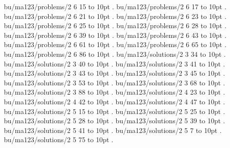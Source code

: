\smallskip
bu/ma123/problems/2 6 15 \leaders\hbox to 10pt {\hss.\hss}  \hfill {}
\smallskip
bu/ma123/problems/2 6 17 \leaders\hbox to 10pt {\hss.\hss}  \hfill {}
\smallskip
bu/ma123/problems/2 6 21 \leaders\hbox to 10pt {\hss.\hss}  \hfill {}
\smallskip
bu/ma123/problems/2 6 23 \leaders\hbox to 10pt {\hss.\hss}  \hfill {}
\smallskip
bu/ma123/problems/2 6 25 \leaders\hbox to 10pt {\hss.\hss}  \hfill {}
\smallskip
bu/ma123/problems/2 6 28 \leaders\hbox to 10pt {\hss.\hss}  \hfill {}
\smallskip
bu/ma123/problems/2 6 39 \leaders\hbox to 10pt {\hss.\hss}  \hfill {}
\smallskip
bu/ma123/problems/2 6 43 \leaders\hbox to 10pt {\hss.\hss}  \hfill {}
\smallskip
bu/ma123/problems/2 6 61 \leaders\hbox to 10pt {\hss.\hss}  \hfill {}
\smallskip
bu/ma123/problems/2 6 65 \leaders\hbox to 10pt {\hss.\hss}  \hfill {}
\smallskip
bu/ma123/problems/2 6 86 \leaders\hbox to 10pt {\hss.\hss}  \hfill {}
\smallskip
bu/ma123/solutions/2 3 34 \leaders\hbox to 10pt {\hss.\hss}  \hfill {}
\smallskip
bu/ma123/solutions/2 3 40 \leaders\hbox to 10pt {\hss.\hss}  \hfill {}
\smallskip
bu/ma123/solutions/2 3 41 \leaders\hbox to 10pt {\hss.\hss}  \hfill {}
\smallskip
bu/ma123/solutions/2 3 43 \leaders\hbox to 10pt {\hss.\hss}  \hfill {}
\smallskip
bu/ma123/solutions/2 3 45 \leaders\hbox to 10pt {\hss.\hss}  \hfill {}
\smallskip
bu/ma123/solutions/2 3 53 \leaders\hbox to 10pt {\hss.\hss}  \hfill {}
\smallskip
bu/ma123/solutions/2 3 68 \leaders\hbox to 10pt {\hss.\hss}  \hfill {}
\smallskip
bu/ma123/solutions/2 3 88 \leaders\hbox to 10pt {\hss.\hss}  \hfill {}
\smallskip
bu/ma123/solutions/2 4 23 \leaders\hbox to 10pt {\hss.\hss}  \hfill {}
\smallskip
bu/ma123/solutions/2 4 42 \leaders\hbox to 10pt {\hss.\hss}  \hfill {}
\smallskip
bu/ma123/solutions/2 4 47 \leaders\hbox to 10pt {\hss.\hss}  \hfill {}
\smallskip
bu/ma123/solutions/2 5 15 \leaders\hbox to 10pt {\hss.\hss}  \hfill {}
\smallskip
bu/ma123/solutions/2 5 25 \leaders\hbox to 10pt {\hss.\hss}  \hfill {}
\smallskip
bu/ma123/solutions/2 5 28 \leaders\hbox to 10pt {\hss.\hss}  \hfill {}
\smallskip
bu/ma123/solutions/2 5 39 \leaders\hbox to 10pt {\hss.\hss}  \hfill {}
\smallskip
bu/ma123/solutions/2 5 41 \leaders\hbox to 10pt {\hss.\hss}  \hfill {}
\smallskip
bu/ma123/solutions/2 5 7 \leaders\hbox to 10pt {\hss.\hss}  \hfill {}
\smallskip
bu/ma123/solutions/2 5 75 \leaders\hbox to 10pt {\hss.\hss}  \hfill {}
\smallskip
